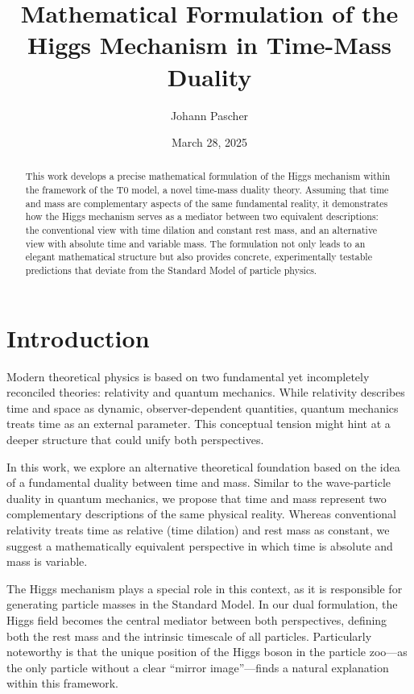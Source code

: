 \documentclass[a4paper,12pt]{article}
\title{Mathematical Formulation of the Higgs Mechanism in Time-Mass Duality}
\author{Johann Pascher}
\date{March 28, 2025}
\begin{document}
	
	\maketitle
	
	\begin{abstract}
		This work develops a precise mathematical formulation of the Higgs mechanism within the framework of the T0 model, a novel time-mass duality theory. Assuming that time and mass are complementary aspects of the same fundamental reality, it demonstrates how the Higgs mechanism serves as a mediator between two equivalent descriptions: the conventional view with time dilation and constant rest mass, and an alternative view with absolute time and variable mass. The formulation not only leads to an elegant mathematical structure but also provides concrete, experimentally testable predictions that deviate from the Standard Model of particle physics.
	\end{abstract}
	
	\tableofcontents
	\newpage
	
	\section{Introduction}
	Modern theoretical physics is based on two fundamental yet incompletely reconciled theories: relativity and quantum mechanics. While relativity describes time and space as dynamic, observer-dependent quantities, quantum mechanics treats time as an external parameter. This conceptual tension might hint at a deeper structure that could unify both perspectives.
	
	In this work, we explore an alternative theoretical foundation based on the idea of a fundamental duality between time and mass. Similar to the wave-particle duality in quantum mechanics, we propose that time and mass represent two complementary descriptions of the same physical reality. Whereas conventional relativity treats time as relative (time dilation) and rest mass as constant, we suggest a mathematically equivalent perspective in which time is absolute and mass is variable.
	
	The Higgs mechanism plays a special role in this context, as it is responsible for generating particle masses in the Standard Model. In our dual formulation, the Higgs field becomes the central mediator between both perspectives, defining both the rest mass and the intrinsic timescale of all particles. Particularly noteworthy is that the unique position of the Higgs boson in the particle zoo—as the only particle without a clear “mirror image”—finds a natural explanation within this framework.
	
\end{document}
